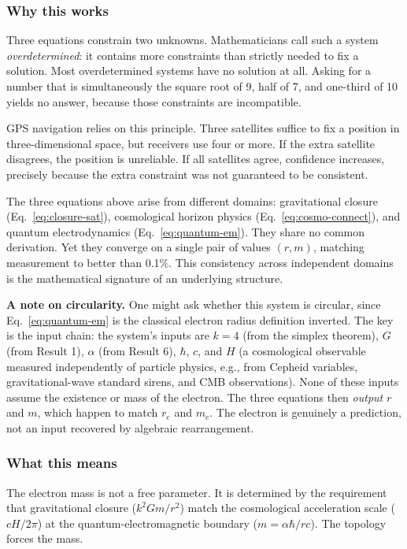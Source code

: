 \documentclass[aps,prd,preprint,superscriptaddress,showpacs,preprintnumbers,amsmath,amssymb,nofootinbib]{revtex4-2}
\begin{document}
\subsubsection*{Why this works}

Three equations constrain two unknowns. Mathematicians call such a system \emph{overdetermined}: it contains more constraints than strictly needed to fix a solution. Most overdetermined systems have no solution at all. Asking for a number that is simultaneously the square root of 9, half of 7, and one-third of 10 yields no answer, because those constraints are incompatible.

GPS navigation relies on this principle. Three satellites suffice to fix a position in three-dimensional space, but receivers use four or more. If the extra satellite disagrees, the position is unreliable. If all satellites agree, confidence increases, precisely because the extra constraint was not guaranteed to be consistent.

The three equations above arise from different domains: gravitational closure (Eq.~\ref{eq:closure-sat}), cosmological horizon physics (Eq.~\ref{eq:cosmo-connect}), and quantum electrodynamics (Eq.~\ref{eq:quantum-em}). They share no common derivation. Yet they converge on a single pair of values $(r, m)$, matching measurement to better than 0.1\%. This consistency across independent domains is the mathematical signature of an underlying structure.

\textbf{A note on circularity.} One might ask whether this system is circular, since Eq.~\ref{eq:quantum-em} is the classical electron radius definition inverted. The key is the input chain: the system's inputs are $k = 4$ (from the simplex theorem), $G$ (from Result 1), $\alpha$ (from Result 6), $\hbar$, $c$, and $H$ (a cosmological observable measured independently of particle physics, e.g., from Cepheid variables, gravitational-wave standard sirens, and CMB observations). None of these inputs assume the existence or mass of the electron. The three equations then \emph{output} $r$ and $m$, which happen to match $r_e$ and $m_e$. The electron is genuinely a prediction, not an input recovered by algebraic rearrangement.

\subsubsection*{What this means}

The electron mass is not a free parameter. It is determined by the requirement that gravitational closure ($k^2 G m/r^2$) match the cosmological acceleration scale ($cH/2\pi$) at the quantum-electromagnetic boundary ($m = \alpha\hbar/rc$). The topology forces the mass.
\end{document}
